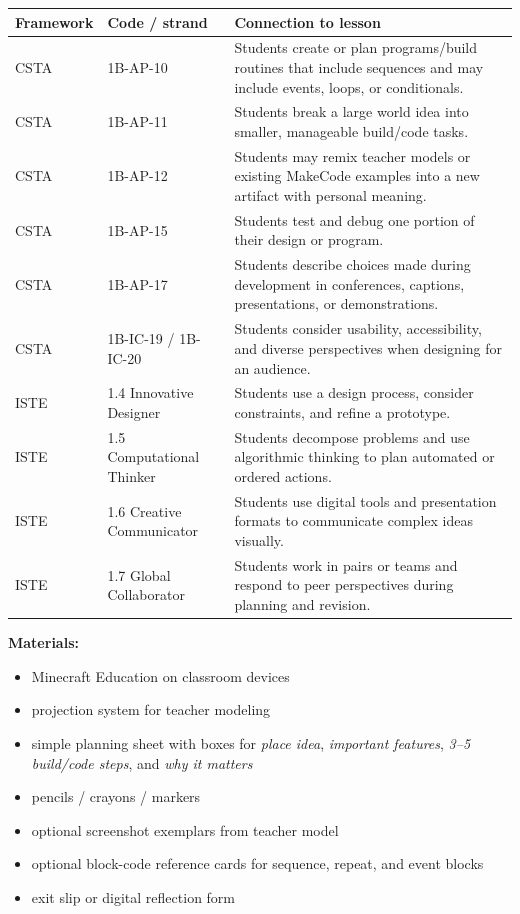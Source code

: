 \documentclass[11pt]{article}
\begin{document}
\begin{tabularx}{\textwidth}{
    L{0.1\textwidth}
    L{0.22\textwidth}
    L{0.7\textwidth}
}
\toprule
\textbf{Framework} & \textbf{Code / strand} & \textbf{Connection to lesson} \\
\midrule
CSTA & 1B-AP-10 & Students create or plan programs/build routines that include sequences and may include events, loops, or conditionals. \\
CSTA & 1B-AP-11 & Students break a large world idea into smaller, manageable build/code tasks. \\
CSTA & 1B-AP-12 & Students may remix teacher models or existing MakeCode examples into a new artifact with personal meaning. \\
CSTA & 1B-AP-15 & Students test and debug one portion of their design or program. \\
CSTA & 1B-AP-17 & Students describe choices made during development in conferences, captions, presentations, or demonstrations. \\
CSTA & 1B-IC-19 / 1B-IC-20 & Students consider usability, accessibility, and diverse perspectives when designing for an audience. \\
ISTE & 1.4 Innovative Designer & Students use a design process, consider constraints, and refine a prototype. \\
ISTE & 1.5 Computational Thinker & Students decompose problems and use algorithmic thinking to plan automated or ordered actions. \\
ISTE & 1.6 Creative Communicator & Students use digital tools and presentation formats to communicate complex ideas visually. \\
ISTE & 1.7 Global Collaborator & Students work in pairs or teams and respond to peer perspectives during planning and revision. \\
\bottomrule
\end{tabularx}

\textbf{Materials:}
\begin{itemize}[leftmargin=*]
    \item Minecraft Education on classroom devices
    \item projection system for teacher modeling
    \item simple planning sheet with boxes for \emph{place idea}, \emph{important features}, \emph{3--5 build/code steps}, and \emph{why it matters}
    \item pencils / crayons / markers
    \item optional screenshot exemplars from teacher model
    \item optional block-code reference cards for sequence, repeat, and event blocks
    \item exit slip or digital reflection form
\end{itemize}
\end{document}
